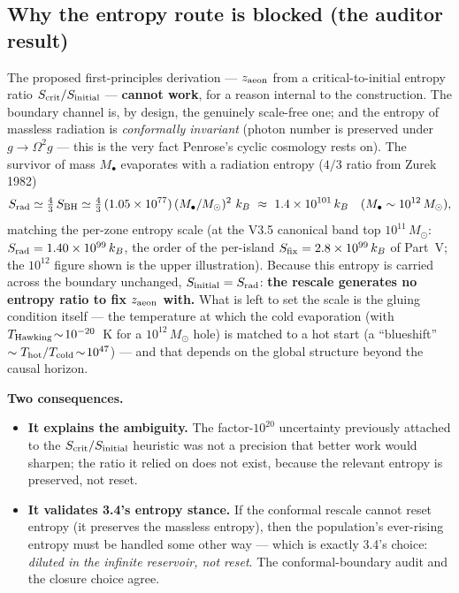 \documentclass[11pt]{article}
\newcommand{\msun}{M_\odot}
\begin{document}
\subsection{Why the entropy route is blocked (the auditor result)}
The proposed first-principles derivation --- $z_{\rm aeon}$ from a critical-to-initial entropy ratio $S_{\rm crit}/S_{\rm initial}$ --- \textbf{cannot work}, for a reason internal to the construction. The boundary channel is, by design, the genuinely scale-free one; and the entropy of massless radiation is \emph{conformally invariant} (photon number is preserved under $g\!\to\!\Omega^2 g$ --- this is the very fact Penrose's cyclic cosmology rests on). The survivor of mass $M_\bullet$ evaporates with a radiation entropy ($4/3$ ratio from Zurek 1982)
\begin{equation}
S_{\rm rad}\simeq \tfrac{4}{3}\,S_{\rm BH}\simeq \tfrac{4}{3}\,(1.05\times10^{77})\,(M_\bullet/\msun)^2\ k_B
\ \approx\ 1.4\times10^{101}\,k_B\quad(M_\bullet\sim10^{12}\,\msun),
\end{equation}
matching the per-zone entropy scale (at the V3.5 canonical band top $10^{11}\,\msun$: $S_{\rm rad}=1.40\times10^{99}\,k_B$, the order of the per-island $S_{\rm fix}=2.8\times10^{99}\,k_B$ of Part~V; the $10^{12}$ figure shown is the upper illustration). Because this entropy is carried across the boundary unchanged, $S_{\rm initial}=S_{\rm rad}$: \textbf{the rescale generates no entropy ratio to fix $z_{\rm aeon}$ with.} What is left to set the scale is the gluing condition itself --- the temperature at which the cold evaporation (with $T_{\rm Hawking}\!\sim\!10^{-20}$~K for a $10^{12}\,\msun$ hole) is matched to a hot start (a ``blueshift'' $\sim T_{\rm hot}/T_{\rm cold}\!\sim\!10^{47}$) --- and that depends on the global structure beyond the causal horizon.

\textbf{Two consequences.}
\begin{itemize}[leftmargin=1.3em,itemsep=2pt]
\item \textbf{It explains the ambiguity.} The factor-$10^{20}$ uncertainty previously attached to the $S_{\rm crit}/S_{\rm initial}$ heuristic was not a precision that better work would sharpen; the ratio it relied on does not exist, because the relevant entropy is preserved, not reset.
\item \textbf{It validates 3.4's entropy stance.} If the conformal rescale cannot reset entropy (it preserves the massless entropy), then the population's ever-rising entropy must be handled some other way --- which is exactly 3.4's choice: \emph{diluted in the infinite reservoir, not reset}. The conformal-boundary audit and the closure choice agree.
\end{itemize}
\end{document}
